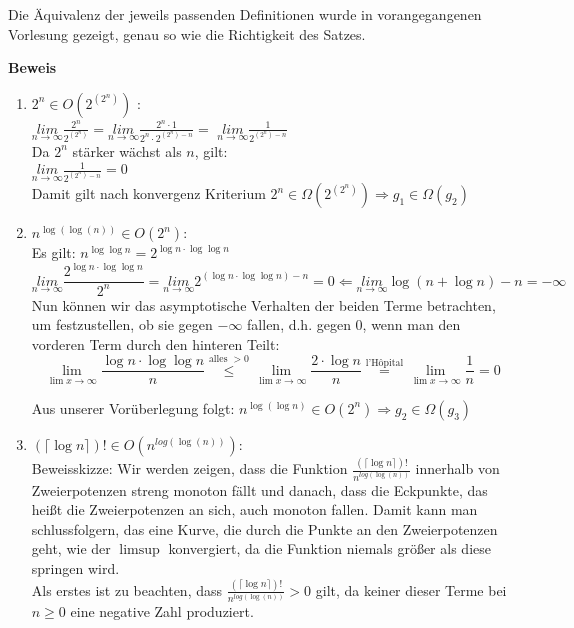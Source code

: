\documentclass[11pt,a4paper,ngerman]{article}
\begin{document}
Die Äquivalenz der jeweils passenden Definitionen wurde in vorangegangenen Vorlesung gezeigt, genau so wie die Richtigkeit des Satzes.

\begin{description}
\item{\textbf{Beweis}} 
\begin{enumerate}[\bfseries 1.]

\item
$  2^n  \in O (2^{(2^n)})$ : \\
$\underset{n\rightarrow\infty}{lim} \frac{2^n}{2^{(2^n)}} = \underset{n\rightarrow\infty}{lim} \frac{2^n \cdot 1}{2^n \cdot 2^{(2^n) - n}} = $
$ \underset{n\rightarrow\infty}{lim} \frac{1}{2^{(2^n) - n}}$\\
Da $2^n$ stärker wächst als $n$, gilt:\\
$ \underset{n\rightarrow\infty}{lim} \frac{1}{2^{(2^n) - n}} = 0$\\
Damit gilt nach konvergenz Kriterium $2^n \in \Omega (2^{(2^n)})\Rightarrow g_1 \in \Omega (g_{2})$

\item
$ n^{\log{(\log{(n)})}} \in O (2^n)$: \\
Es gilt: $n^{\log \log n} = 2^{\log n \cdot \log \log n}$\\
$$
\underset{n\rightarrow\infty}{lim} \frac{ 2^{\log n \cdot \log \log n}}{2^n} = \underset{n\rightarrow\infty}{lim}  2^{(\log n \cdot \log \log n )- n} = 0 \Leftarrow \underset{n\rightarrow\infty}{lim} \log (n + \log n) - n = - \infty
$$
Nun können wir das asymptotische Verhalten der beiden Terme betrachten, um festzustellen, ob sie gegen $-\infty$ fallen, d.h. gegen 0, wenn man den vorderen Term durch den hinteren Teilt:\\
$$
\underset{\lim x \rightarrow \infty}{\lim} \frac{\log n \cdot \log \log n}{n} \stackrel{\text{alles }>0}{\leq} \underset{\lim x \rightarrow \infty}{\lim} \frac{2 \cdot \log n}{n} \stackrel{\text{l'Hôpital}}{=}  \underset{\lim x \rightarrow \infty}{\lim} \frac{1}{n} = 0
$$

Aus unserer Vorüberlegung folgt: $n^{\log (\log n)} \in O(2^n) \Rightarrow g_2 \in \Omega (g_3)$

\item
$(\lceil \log{n} \rceil)! \in O (n^{log{(\log{(n)})}})$: \\

Beweisskizze: Wir werden zeigen, dass die Funktion $\frac{(\lceil \log{n} \rceil)!}{n^{log{(\log{(n)})}}}$ innerhalb von Zweierpotenzen streng monoton fällt und danach, dass die Eckpunkte, das heißt die Zweierpotenzen an sich, auch monoton fallen. Damit kann man schlussfolgern, das eine Kurve, die durch die Punkte an den Zweierpotenzen geht, wie der $\limsup$ konvergiert, da die Funktion niemals größer als diese springen wird.\\
Als erstes ist zu beachten, dass  $\frac{(\lceil \log{n} \rceil)!}{n^{log{(\log{(n)})}}} > 0$ gilt, da keiner dieser Terme bei $n\geq 0$ eine negative Zahl produziert.


\end{enumerate}
\end{description}
\end{document}
